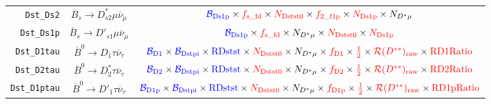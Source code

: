 \begin{landscape}
\begin{table}
\begin{tabular}{r|c|c}
     \texttt{Dst\_Ds2} &           $\overline{B}_s \rightarrow D_{s2}^* \mu \overline{\nu}_\mu$            &                                                                            $\textcolor{blue}{\mathcal{B}_\text{Ds1p}} \times \textcolor{red}{f_\text{s\_fd}} \times \textcolor{red}{N_\text{Dstst0}} \times \textcolor{red}{f_\text{2\_f1p}} \times \textcolor{red}{N_\text{Ds1p}} \times N_{D^* \mu}$                                                                             \\
    \texttt{Dst\_Ds1p} &            $\overline{B}_s \rightarrow D'_{s1} \mu \overline{\nu}_\mu$            &                                                                                                $\textcolor{blue}{\mathcal{B}_\text{Ds1p}} \times \textcolor{red}{f_\text{s\_fd}} \times N_{D^* \mu} \times \textcolor{red}{N_\text{Dstst0}} \times \textcolor{red}{N_\text{Ds1p}}$                                                                                                 \\
   \texttt{Dst\_D1tau} &             $\overline{B}^0 \rightarrow D_1 \tau \overline{\nu}_\tau$             &        $\textcolor{blue}{\mathcal{B}_\text{D1}} \times \textcolor{blue}{\mathcal{B}_\text{Dstpi}} \times \textcolor{blue}{\text{RDstst}} \times \textcolor{red}{N_\text{Dstst0}} \times N_{D^* \mu} \times \textcolor{red}{f_\text{D1}} \times \textcolor{red}{\frac{1}{2}} \times \textcolor{red}{\mathcal{R}(D^{**})_\text{raw}} \times \textcolor{red}{\text{RD1Ratio}}$        \\
   \texttt{Dst\_D2tau} &            $\overline{B}^0 \rightarrow D^*_2 \tau \overline{\nu}_\tau$            &        $\textcolor{blue}{\mathcal{B}_\text{D2}} \times \textcolor{blue}{\mathcal{B}_\text{Dstpi}} \times \textcolor{blue}{\text{RDstst}} \times \textcolor{red}{N_\text{Dstst0}} \times N_{D^* \mu} \times \textcolor{red}{f_\text{D2}} \times \textcolor{red}{\frac{1}{2}} \times \textcolor{red}{\mathcal{R}(D^{**})_\text{raw}} \times \textcolor{red}{\text{RD2Ratio}}$        \\
  \texttt{Dst\_D1ptau} &            $\overline{B}^0 \rightarrow D'_1 \tau \overline{\nu}_\tau$             &      $\textcolor{blue}{\mathcal{B}_\text{D1p}} \times \textcolor{blue}{\mathcal{B}_\text{Dstpi}} \times \textcolor{blue}{\text{RDstst}} \times \textcolor{red}{N_\text{Dstst0}} \times N_{D^* \mu} \times \textcolor{red}{f_\text{D1p}} \times \textcolor{red}{\frac{1}{2}} \times \textcolor{red}{\mathcal{R}(D^{**})_\text{raw}} \times \textcolor{red}{\text{RD1pRatio}}$       \\

\end{tabular}
\end{table}
\end{landscape}
